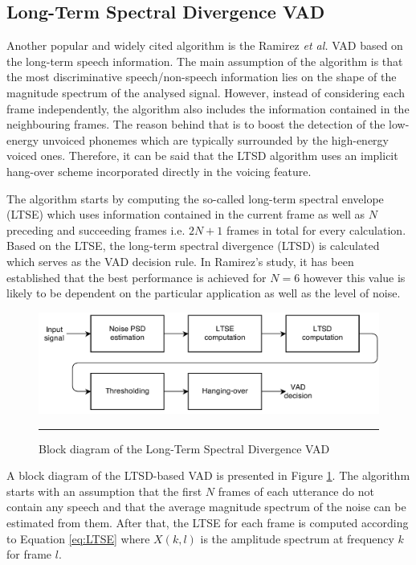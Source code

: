 \subsection{Long-Term Spectral Divergence VAD}

Another popular and widely cited algorithm is the Ramirez \emph{et al.} \cite{LTSD} VAD based on the long-term speech information. The main assumption of the algorithm is that the most discriminative speech/non-speech information lies on the shape of the magnitude spectrum of the analysed signal. However, instead of considering each frame independently, the algorithm also includes the information contained in the neighbouring frames. The reason behind that is to boost the detection of the low-energy unvoiced phonemes which are typically surrounded by the high-energy voiced ones. Therefore, it can be said that the LTSD algorithm uses an implicit hang-over scheme incorporated directly in the voicing feature.

The algorithm starts by computing the so-called long-term spectral envelope (LTSE) which uses information contained in the current frame as well as $N$ preceding and succeeding frames i.e. $2N+1$ frames in total for every calculation. Based on the LTSE, the long-term spectral divergence (LTSD) is calculated which serves as the VAD decision rule. In Ramirez's study, it has been established that the best performance is achieved for $N=6$ however this value is likely to be dependent on the particular application as well as the level of noise.

\begin{figure}[htbp]
	\centering
		\includegraphics[width=0.9\columnwidth]{Figures/Chapter2/LTSD.png}
		\rule{37em}{0.5pt}
	\caption[Block diagram of the Long-Term Spectral Divergence VAD]{Block diagram of the Long-Term Spectral Divergence VAD \cite{LTSD}}
	\label{fig:LTSD}
\end{figure}

A block diagram of the LTSD-based VAD is presented in Figure \ref{fig:LTSD}. The algorithm starts with an assumption that the first $N$ frames of each utterance do not contain any speech and that the average magnitude spectrum of the noise can be estimated from them. After that, the LTSE for each frame is computed according to Equation \ref{eq:LTSE} where $X(k,l)$ is the amplitude spectrum at frequency $k$ for frame $l$.

